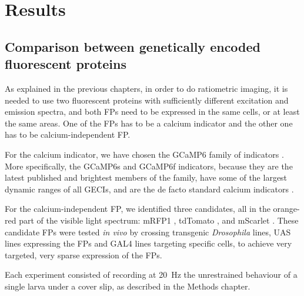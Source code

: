 \chapter{Results}

\graphicspath{{Chapter4/Figs/}}


\section{Comparison between genetically encoded fluorescent proteins}



As explained in the previous chapters, in order to do ratiometric imaging, it is needed to use two
fluorescent proteins with sufficiently different excitation and emission spectra, and both FPs need
to be expressed in the same cells, or at least the same areas. One of the FPs has to be a calcium
indicator and the other one has to be calcium-independent FP.


For the calcium indicator, we have chosen the GCaMP6 family of indicators
\citep{nakai2001high,chen2013ultrasensitive}. More specifically, the GCaMP6s and GCaMP6f
indicators, because they are the latest published and brightest members of the family, have some
of the largest dynamic ranges of all GECIs, and are the de facto standard calcium indicators
\citep{lin2016genetically}.


For the calcium-independent FP, we identified three candidates, all in the orange-red part of the
visible light spectrum: mRFP1 \citep{campbell2002monomeric}, tdTomato \citep{shaner2004improved},
and mScarlet \citep{bindels2017mscarlet}. These candidate FPs were tested \textit{in vivo} by
crossing transgenic \textit{Drosophila} lines, UAS lines expressing the FPs and GAL4 lines targeting
specific cells, to achieve very targeted, very sparse expression of the FPs.

Each experiment consisted of recording at \SI{20}{\hertz} the unrestrained behaviour of a single
larva under a cover slip, as described in the Methods chapter.


